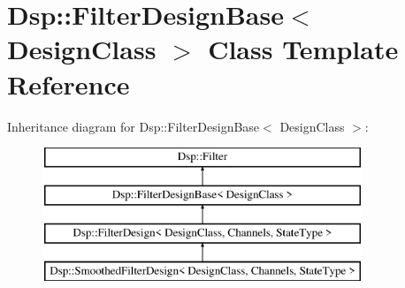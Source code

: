 \hypertarget{classDsp_1_1FilterDesignBase}{\section{Dsp\-:\-:Filter\-Design\-Base$<$ Design\-Class $>$ Class Template Reference}
\label{classDsp_1_1FilterDesignBase}
}
Inheritance diagram for Dsp\-:\-:Filter\-Design\-Base$<$ Design\-Class $>$\-:\begin{figure}[H]
\begin{center}
\leavevmode
\includegraphics[height=4.000000cm]{classDsp_1_1FilterDesignBase}
\end{center}
\end{figure}
